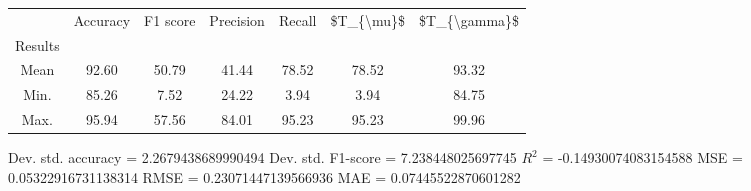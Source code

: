 \begin{tabular}{|c|c|c|c|c|c|c|}
\toprule
{} &  Accuracy &  F1 score &  Precision &  Recall &  \$T\_\{\textbackslash mu\}\$ &  \$T\_\{\textbackslash gamma\}\$ \\
Results &           &           &            &         &            &               \\
\hline
Mean    &     92.60 &     50.79 &      41.44 &   78.52 &      78.52 &         93.32 \\
Min.    &     85.26 &      7.52 &      24.22 &    3.94 &       3.94 &         84.75 \\
Max.    &     95.94 &     57.56 &      84.01 &   95.23 &      95.23 &         99.96 \\
\bottomrule
\end{tabular}

 Dev. std. accuracy = 2.2679438689990494
 Dev. std. F1-score = 7.238448025697745
 $R^2$ = -0.14930074083154588
 MSE = 0.05322916731138314
 RMSE = 0.23071447139566936
 MAE = 0.07445522870601282